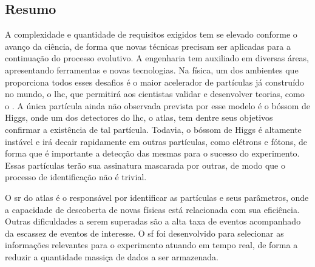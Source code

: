 \vfill
\begin{center}
\section*{Resumo\label{Resumo}}
\end{center}


A complexidade e quantidade de requisitos exigidos tem se elevado conforme o avanço da ciência, 
de forma que novas técnicas precisam ser aplicadas para a continuação do processo evolutivo.
A engenharia tem auxiliado em diversas áreas, apresentando ferramentas e novas tecnologias. 
Na física, um dos ambientes que proporciona todos esses desafios é o maior acelerador 
de partículas já construído no mundo, o \acrshort{lhc}, que permitirá aos
cientistas validar e desenvolver teorias, como o . A
única partícula ainda não observada prevista por esse modelo é o bóssom
de Higgs, onde um dos detectores do \acrshort{lhc}, o \acrshort{atlas}, tem dentre seus objetivos 
confirmar a existência de tal partícula. Todavia, o bóssom de Higgs é altamente instável 
e irá decair rapidamente em outras partículas, como elétrons e fótons, de forma que é importante 
a detecção das mesmas para o sucesso do experimento. Essas partículas terão sua
assinatura mascarada por outras, de modo que o processo de identificação não é
trivial. 

O \gls{sr} do \acrshort{atlas} é o responsável por identificar as
partículas e seus parâmetros, onde a capacidade de descoberta de novas físicas 
está relacionada com sua eficiência. Outras dificuldades a serem superadas são a alta taxa de
eventos acompanhado da escassez de eventos de interesse. 
O \gls{sf} foi desenvolvido para selecionar as informações relevantes para o experimento 
atuando em tempo real, de forma a reduzir a quantidade massiça de dados a ser armazenada.


